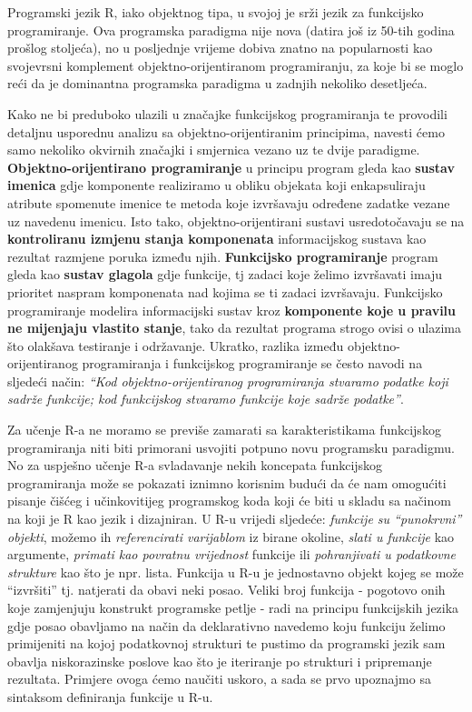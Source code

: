 \documentclass[]{book}
\theoremstyle{definition}
\theoremstyle{definition}
\theoremstyle{definition}
\theoremstyle{remark}
\begin{document}
Programski jezik R, iako objektnog tipa, u svojoj je srži jezik za
funkcijsko programiranje. Ova programska paradigma nije nova (datira još
iz 50-tih godina prošlog stoljeća), no u posljednje vrijeme dobiva
znatno na popularnosti kao svojevrsni komplement objektno-orijentiranom
programiranju, za koje bi se moglo reći da je dominantna programska
paradigma u zadnjih nekoliko desetljeća.

Kako ne bi preduboko ulazili u značajke funkcijskog programiranja te
provodili detaljnu usporednu analizu sa objektno-orijentiranim
principima, navesti ćemo samo nekoliko okvirnih značajki i smjernica
vezano uz te dvije paradigme. \textbf{Objektno-orijentirano
programiranje} u principu program gleda kao \textbf{sustav imenica} gdje
komponente realiziramo u obliku objekata koji enkapsuliraju atribute
spomenute imenice te metoda koje izvršavaju određene zadatke vezane uz
navedenu imenicu. Isto tako, objektno-orijentirani sustavi
usredotočavaju se na \textbf{kontroliranu izmjenu stanja komponenata}
informacijskog sustava kao rezultat razmjene poruka između njih.
\textbf{Funkcijsko programiranje} program gleda kao \textbf{sustav
glagola} gdje funkcije, tj zadaci koje želimo izvršavati imaju prioritet
naspram komponenata nad kojima se ti zadaci izvršavaju. Funkcijsko
programiranje modelira informacijski sustav kroz \textbf{komponente koje
u pravilu ne mijenjaju vlastito stanje}, tako da rezultat programa
strogo ovisi o ulazima što olakšava testiranje i održavanje. Ukratko,
razlika između objektno-orijentiranog programiranja i funkcijskog
programiranje se često navodi na sljedeći način: \emph{``Kod
objektno-orijentiranog programiranja stvaramo podatke koji sadrže
funkcije; kod funkcijskog stvaramo funkcije koje sadrže podatke''}.

Za učenje R-a ne moramo se previše zamarati sa karakteristikama
funkcijskog programiranja niti biti primorani usvojiti potpuno novu
programsku paradigmu. No za uspješno učenje R-a svladavanje nekih
koncepata funkcijskog programiranja može se pokazati iznimno korisnim
budući da će nam omogućiti pisanje čišćeg i učinkovitijeg programskog
koda koji će biti u skladu sa načinom na koji je R kao jezik i
dizajniran. U R-u vrijedi sljedeće: \emph{funkcije su ``punokrvni''
objekti}, možemo ih \emph{referencirati varijablom} iz birane okoline,
\emph{slati u funkcije} kao argumente, \emph{primati kao povratnu
vrijednost} funkcije ili \emph{pohranjivati u podatkovne strukture} kao
što je npr. lista. Funkcija u R-u je jednostavno objekt kojeg se može
``izvršiti'' tj. natjerati da obavi neki posao. Veliki broj funkcija -
pogotovo onih koje zamjenjuju konstrukt programske petlje - radi na
principu funkcijskih jezika gdje posao obavljamo na način da
deklarativno navedemo koju funkciju želimo primijeniti na kojoj
podatkovnoj strukturi te pustimo da programski jezik sam obavlja
niskorazinske poslove kao što je iteriranje po strukturi i pripremanje
rezultata. Primjere ovoga ćemo naučiti uskoro, a sada se prvo upoznajmo
sa sintaksom definiranja funkcije u R-u.
\end{document}
